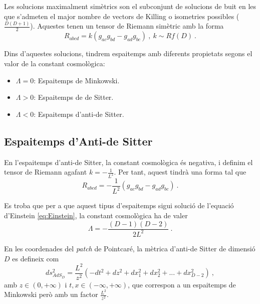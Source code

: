 \documentclass[twocolumn]{article}
\begin{document}
Les solucions maximalment simètrics son el subconjunt de solucions de buit en les que s'admeten el major nombre de vectors de Killing o isometries possibles ($\frac{D(D+1)}{2}$). Aquestes tenen un tensor de Riemann simètric amb la forma
\begin{equation}
    R_{abcd} = k ( g_{ac} g_{bd} - g_{ad} g_{bc} ) \ , \ k \sim R f(D) \ .
\label{eq:SolMaximRiemann}
\end{equation}

Dins d'aquestes solucions, tindrem espaitemps amb diferents propietats segons el valor de la constant cosmològica:
\begin{itemize}
    \item $\Lambda = 0$: Espaitemps de Minkowski.
    \item $\Lambda > 0$: Espaitemps de de Sitter.
    \item $\Lambda < 0$: Espaitemps d'anti-de Sitter.
\end{itemize}

\subsection{Espaitemps d'Anti-de Sitter}

En l'espaitemps d'anti-de Sitter, la constant cosmològica és negativa, i definim el tensor de Riemann agafant $k=-\frac{1}{L^2}$. Per tant, aquest tindrà una forma tal que
\begin{equation}
    R_{abcd} = -\frac{1}{L^2} ( g_{ac} g_{bd} - g_{ad} g_{bc} ) \ .
\label{AdSRiemann}
\end{equation}

Es troba que per a que aquest tipus d'espaitemps sigui solució de l'equació d'Einstein \ref{eq:Einstein}, la constant cosmològica ha de valer
\begin{equation}
    \Lambda = - \frac{(D-1)(D-2)}{2L^2} \ .
\label{eq:AdSLambda}
\end{equation}

En les coordenades del \textit{patch} de Pointcaré, la mètrica d'anti-de Sitter de dimensió $D$ es defineix com
\begin{equation}
    ds_{AdS_D}^2 = \frac{L^2}{z^2} ( -dt^2 + dz^2 + dx_1^2 + dx_2^2 + ... + dx_{D-2}^2 ) \ ,
\label{eq:MetPointcareAdS}
\end{equation}
amb $z \in (0,+\infty)$ i $t,x \in (-\infty,+\infty)$, que correspon a un espaitemps de Minkowski però amb un factor $\frac{L^2}{z^2}$.
\end{document}
